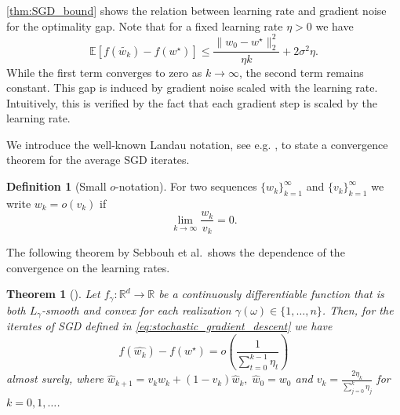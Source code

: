 \documentclass[12pt]{article}
\newtheorem{theorem}{Theorem}[section]
\newtheorem{lemma}[lemma]{Lemma}
\theoremstyle{definition}
\newtheorem{definition}[definition]{Definition}
\numberwithin{equation}{section}
\newcommand{\R}{\mathbb{R}}
\newcommand{\E}{\mathbb{E}}
\newcommand{\CF}{\mathcal{F}}
\newcommand{\ev}[1]{\mathbb{E}\left[{#1}\right]}
\newcommand{\norm}[1]{\lVert{#1}\rVert_2}
\begin{document}
\autoref{thm:SGD_bound} shows the relation between learning rate and gradient noise for the optimality gap. Note that for a fixed learning rate $\eta > 0$ we have
\begin{equation*}
  \E [f(\widetilde{w_{k}}) - f(w^\star)] \leq \frac{\norm{w_{0} - w^\star}^2}{\eta k} + 2 \sigma^2 \eta.
\end{equation*}
While the first term converges to zero as $k \rightarrow \infty$, the second term remains constant. This gap is induced by gradient noise scaled with the learning rate. Intuitively, this is verified by the fact that each gradient step is scaled by the learning rate.

We introduce the well-known Landau notation, see e.g. \cite{knuthBigOmicronBig1976}, to state a convergence theorem for the average SGD iterates.
\begin{definition}[Small $o$-notation]
  For two sequences $\{w_k\}_{k=1}^\infty$ and $\{v_k\}_{k=1}^\infty$ we write $w_k = o(v_k)$ if
  \begin{equation*}
    \lim_{k \rightarrow \infty} \frac{w_k}{v_k} = 0.
  \end{equation*}
\end{definition}
The following theorem by Sebbouh et al.\ shows the dependence of the convergence on the learning rates.
\begin{theorem}[]
  \label{thm:almost_sure_convergence}
  Let $f_{\gamma} : \R^d \rightarrow \R$ be a continuously differentiable function that is both $L_{\gamma}$-smooth and convex for each realization $\gamma(\omega) \in \{1,\dots,n\}$. Then, for the iterates of SGD defined in \eqref{eq:stochastic_gradient_descent} we have 
  \begin{equation*}
    f(\widehat{w_{k}}) - f(w^\star) = o\left(\frac{1}{\sum_{t=0}^{k-1}\eta_t}\right)
  \end{equation*}
  almost surely, where $\widehat{w}_{k+1} = v_k w_k + (1-v_k)\widehat{w}_k, \; \widehat{w}_0 = w_0$ and $v_k = \frac{2\eta_k}{\sum_{j=0}^k\eta_j}$ for $k=0,1,\dots$.
\end{theorem}
\end{document}
